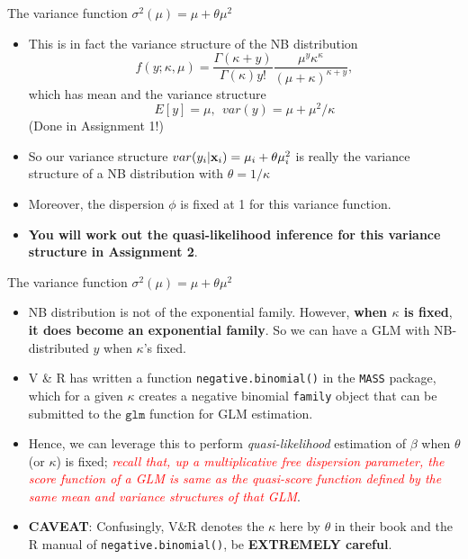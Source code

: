 \documentclass{beamer}
\newenvironment{wideitemize}%
  {\begin{itemize}%
    \setlength{\parskip}{1em}}%
  {\end{itemize}}
\begin{document}
\begin{frame} {The variance function $\sigma^2 (\mu)= \mu + \theta \mu^2 $}
\begin{wideitemize}
\item This is in fact the variance structure of the NB distribution
\[
f(y; \kappa, \mu) = \frac{\Gamma(\kappa + y)}{\Gamma(\kappa) y!}\frac{\mu^y \kappa^\kappa}{(\mu + \kappa)^{\kappa + y}},
\]
which has mean and the variance structure
\[
E[y] = \mu, \ \ var(y) = \mu + \mu^2/\kappa
\]
(Done in Assignment 1!)

\item So our variance structure $var(y_i | {\bf x}_i) = \mu_i + \theta \mu_i^2 $ is really the variance structure of a NB distribution with $\theta = 1/\kappa$


\item Moreover, the dispersion $\phi$ is fixed at 1 for this variance function.

\item {\bf You will work out the quasi-likelihood inference for this variance structure in Assignment 2}.

\end{wideitemize}


\end{frame}

\begin{frame} {The variance function $\sigma^2 (\mu)= \mu + \theta \mu^2 $}
\begin{wideitemize}
\item NB distribution is not of the exponential family. However, {\bf when $\kappa$ is fixed}, {\bf it does become an exponential family}. So we can have a GLM with NB-distributed $y$  when $\kappa$'s fixed.
\item V \& R has written a function \texttt{negative.binomial()} in the \texttt{MASS} package, which for a given $\kappa$ creates a negative binomial \texttt{family} object that can be submitted to the $\texttt{glm}$ function for GLM estimation. 

\item Hence, we can leverage this to perform \emph{quasi-likelihood} estimation of $\beta$ when $\theta$(or $\kappa$) is fixed; \textcolor{red}{\emph{recall that, up a multiplicative free dispersion parameter, the score function of a GLM is same as the quasi-score function defined by the same mean and variance structures of that GLM}}. 

\item {\bf CAVEAT}: Confusingly, V\&R denotes the $\kappa$ here by $\theta$ in their book and the R manual of \texttt{negative.binomial()}, be {\bf EXTREMELY careful}.
\end{wideitemize}



\end{frame}
\end{document}

